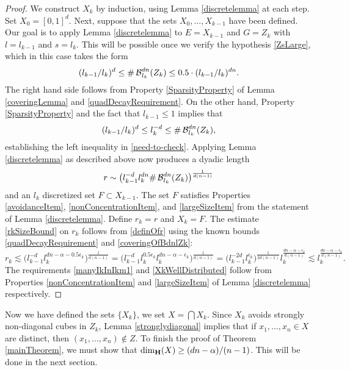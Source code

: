 \begin{proof}
	We construct $X_k$ by induction, using Lemma \ref{discretelemma} at each step. Set $X_0=[0,1]^d$. Next, suppose that the sets $X_0, \ldots, X_{k-1}$ have been defined. Our goal is to apply Lemma \ref{discretelemma} to $E = X_{k-1}$ and $G = Z_k$ with $l = l_{k-1}$ and $s = l_k$. This will be possible once we verify the hypothesis \eqref{ZsLarge}, which in this case takes the form
	\begin{equation}
		(l_{k-1}/l_k)^d \leq \#\operatorname{\mathcal{B}}_{l_k}^{dn}(Z_k) \leq 0.5 \cdot (l_{k-1}/l_k)^{dn}. \label{need-to-check}
	\end{equation}
	The right hand side follows from Property \ref{SparsityProperty} of Lemma \ref{coveringLemma} and \eqref{quadDecayRequirement}. 	On the other hand, Property \ref{SparsityProperty} and the fact that $l_{k-1} \leq 1$ implies that
	\[ (l_{k-1}/l_k)^d\leq l_{k}^{-d}\leq \#\operatorname{\mathcal{B}}_{l_k}^{dn}(Z_k), \]
	establishing the left inequality in \eqref{need-to-check}. Applying Lemma \ref{discretelemma} as described above now produces a dyadic length
	\begin{equation}\label{definOfr}
		r \sim \big(l_{k-1}^{-d}l_k^{dn} \# \operatorname{\mathcal{B}}^{dn}_{l_k}(Z_k)\big)^{\frac{1}{d(n-1)}} 
	\end{equation}
	and an $l_k$ discretized set $F \subset X_{k-1}$. The set $F$ satisfies Properties \ref{avoidanceItem}, \ref{nonConcentrationItem}, and \ref{largeSizeItem} from the statement of Lemma \ref{discretelemma}. Define $r_k=r$ and $X_k=F$. The estimate  \eqref{rkSizeBound} on $r_k$ follows from \eqref{definOfr} using the known bounds \eqref{quadDecayRequirement} and \eqref{coveringOfBdnlZk}:
	\[ r_k \lesssim \bigl( l_{k-1}^{-d}  l_k^{dn -\alpha - 0.5 \epsilon_k} \bigr)^{\frac{1}{d(n-1)}} = \bigl( l_{k-1}^{-d} l_k^{0.5 \epsilon_k} l_k^{dn -\alpha - \epsilon_k} \bigr)^{\frac{1}{d(n-1)}} = \bigl( l_{k-1}^{-2d} l_k^{\epsilon_k}\bigr)^{\frac{1}{2d(n-1)}} l_{k}^{\frac{dn-\alpha -\epsilon_k}{d(n-1)}} \lesssim l_{k}^{\frac{dn-\alpha -\epsilon_k}{d(n-1)}}. \]
	The requirements \eqref{manyIkInIkm1} and \eqref{XkWellDistributed} follow from Properties \ref{nonConcentrationItem} and \ref{largeSizeItem} of Lemma \ref{discretelemma} respectively.
\end{proof} 

Now we have defined the sets $\{ X_k \}$, we set $X = \bigcap X_k$. Since $X_k$ avoids strongly non-diagonal cubes in $Z_k$, Lemma \ref{stronglydiagonal} implies that if $x_1, \dots, x_n \in X$ are distinct, then $(x_1, \dots, x_n) \not \in Z$. To finish the proof of Theorem \ref{mainTheorem}, we must show that $\operatorname{\dim_{\mathbf{H}}}(X) \geq (dn - \alpha)/(n - 1)$. This will be done in the next section. 







